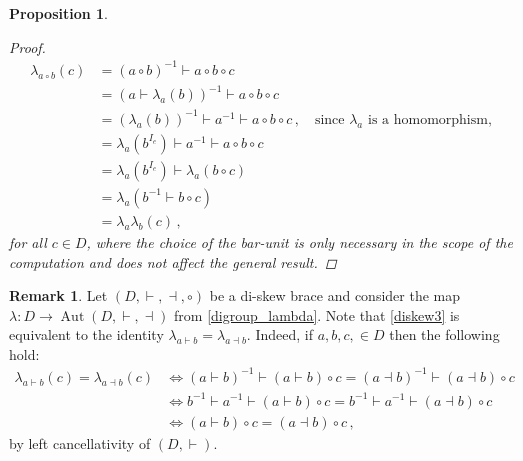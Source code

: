 \documentclass[preprint,1p]{elsarticle}
\numberwithin{equation}{section}
\newtheorem{prop}[theor]{Proposition}
\theoremstyle{definition}               %
\newtheorem{rem}[theor]{Remark}
\newcommand{\vd}{\vdash}
\newcommand{\dv}{\dashv}
\DeclareMathOperator{\Aut}{Aut}
\begin{document}
\begin{prop}
\begin{proof}
        \begin{align*}
            \lambda_{a \circ b}(c) &=
            (a \circ b)^{-1} \vd a \circ b \circ c \\
            &= (a \vd \lambda_a(b))^{-1} \vd a \circ b \circ c \\
            &= (\lambda_a(b))^{-1} \vd a^{-1} \vd a \circ b \circ c\,, \quad
            \text{since $\lambda_a$ is a homomorphism,} \\
            &= \lambda_a(b^{I_e}) \vd a^{-1} \vd a \circ b \circ c \\
            &= \lambda_a(b^{I_e}) \vd \lambda_a(b \circ c) \\
            &= \lambda_a(b^{-1} \vd b \circ c) \\
            &= \lambda_a\lambda_b(c) \,,
        \end{align*}
        for all $c \in D$, where the choice of the bar-unit is only necessary in the scope of the computation and does not affect the general result.
    \end{proof}
\end{prop}

\begin{rem}\label{rem:lambda_index}
    Let $(D,\vd,\dv,\circ)$ be a di-skew brace and consider the map ${\lambda:D \to \Aut(D,\vd,\dv)}$ from \cref{digroup_lambda}.
    Note that \eqref{diskew3} is equivalent to the identity $\lambda_{a \vd b} = \lambda_{a \dv b}$.
    Indeed, if $a,b,c, \in D$ then the following hold:
    \begin{align*}
        \lambda_{a \vd b}(c) = \lambda_{a \dv b}(c) 
        &\iff
        (a \vd b)^{-1} \vd (a \vd b) \circ c = (a \dv b)^{-1} \vd (a \dv b) \circ c \\
        &\iff
        b^{-1} \vd a^{-1} \vd (a \vd b) \circ c = b^{-1} \vd a^{-1} \vd (a \dv b) \circ c \\
        &\iff (a \vd b) \circ c = (a \dv b) \circ c \,,
    \end{align*}
    by left cancellativity of $(D,\vd)$.
\end{rem}
\end{document}
